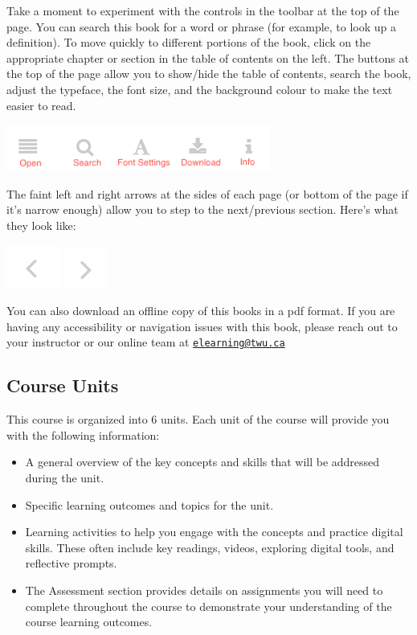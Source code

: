\documentclass[
]{book}
\providecommand{\tightlist}{%
  \setlength{\itemsep}{0pt}\setlength{\parskip}{0pt}}
\theoremstyle{definition}
\theoremstyle{definition}
\theoremstyle{definition}
\theoremstyle{definition}
\theoremstyle{remark}
\begin{document}
Take a moment to experiment with the controls in the toolbar at the top of the page. You can search this book for a word or phrase (for example, to look up a definition). To move quickly to different portions of the book, click on the appropriate chapter or section in the table of contents on the left. The buttons at the top of the page allow you to show/hide the table of contents, search the book, adjust the typeface, the font size, and the background colour to make the text easier to read.

\includegraphics{assets/course-intro/menu.png}

The faint left and right arrows at the sides of each page (or bottom of the page if it's narrow enough) allow you to step to the next/previous section. Here's what they look like:

\includegraphics{assets/course-intro/left_arrow.png} \includegraphics{assets/course-intro/right_arrow.png}

You can also download an offline copy of this books in a pdf format. If you are having any accessibility or navigation issues with this book, please reach out to your instructor or our online team at \href{mailto:elearning@twu.ca}{\nolinkurl{elearning@twu.ca}}

\hypertarget{course-units}{%
\subsection*{Course Units}\label{course-units}}

This course is organized into 6 units. Each unit of the course will provide you with the following information:

\begin{itemize}
\tightlist
\item
  A general overview of the key concepts and skills that will be addressed during the unit.
\item
  Specific learning outcomes and topics for the unit.
\item
  Learning activities to help you engage with the concepts and practice digital skills. These often include key readings, videos, exploring digital tools, and reflective prompts.
\item
  The Assessment section provides details on assignments you will need to complete throughout the course to demonstrate your understanding of the course learning outcomes.
\end{itemize}
\end{document}
